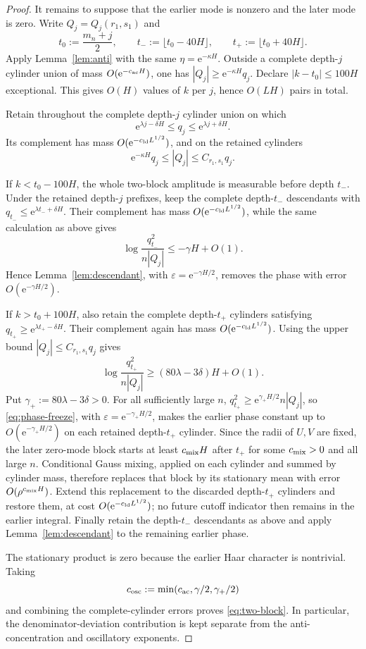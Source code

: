 \documentclass[11pt,a4paper]{amsart}
\theoremstyle{definition}
\theoremstyle{remark}
\newcommand{\e}{\mathrm e}
\begin{document}
\begin{proof}
It remains to suppose that the earlier mode is nonzero and the later mode is
zero.  Write $Q_j=Q_j(r_1,s_1)$ and
\[
 t_0:=\frac{m_n+j}{2},\qquad
 t_-:=\lfloor t_0-40H\rfloor,
 \qquad t_+:=\lfloor t_0+40H\rfloor.
\]
Apply Lemma~\ref{lem:anti} with the same
$\eta=\e^{-\kappa H}$.  Outside a complete depth-$j$ cylinder union of mass
$O(\e^{-c_{\rm ac}H})$, one has
$|Q_j|\ge\e^{-\kappa H}q_j$.  Declare
$|k-t_0|\le100H$ exceptional.  This gives $O(H)$ values of $k$ per $j$,
hence $O(LH)$ pairs in total.

Retain throughout the complete depth-$j$ cylinder union on which
\[
 \e^{\lambda j-\delta H}\le q_j\le\e^{\lambda j+\delta H}.
\]
Its complement has mass $O(\e^{-c_{\rm ld}L^{1/2}})$, and on the retained
cylinders
\[
 \e^{-\kappa H}q_j\le |Q_j|\le C_{r_1,s_1}q_j.
\]

If $k<t_0-100H$, the whole two-block amplitude is measurable before depth
$t_-$.  Under the retained depth-$j$ prefixes, keep the complete
depth-$t_-$ descendants with $q_{t_-}\le\e^{\lambda t_-+\delta H}$.  Their
complement has mass $O(\e^{-c_{\rm ld}L^{1/2}})$, while the same calculation
as above gives
\[
 \log\frac{q_{t_-}^2}{n|Q_j|}\le-\gamma H+O(1).
\]
Hence Lemma~\ref{lem:descendant}, with
$\varepsilon=\e^{-\gamma H/2}$, removes the phase with error
$O(\e^{-\gamma H/2})$.

If $k>t_0+100H$, also retain the complete depth-$t_+$ cylinders satisfying
$q_{t_+}\ge\e^{\lambda t_+-\delta H}$.  Their complement again has mass
$O(\e^{-c_{\rm ld}L^{1/2}})$.  Using the upper bound
$|Q_j|\le C_{r_1,s_1}q_j$ gives
\[
 \log\frac{q_{t_+}^2}{n|Q_j|}
 \ge(80\lambda-3\delta)H+O(1).
\]
Put $\gamma_+:=80\lambda-3\delta>0$.  For all sufficiently large $n$,
$q_{t_+}^2\ge\e^{\gamma_+H/2}n|Q_j|$, so
\eqref{eq:phase-freeze}, with $\varepsilon=\e^{-\gamma_+H/2}$, makes the
earlier phase constant up to $O(\e^{-\gamma_+H/2})$ on each retained
depth-$t_+$ cylinder.  Since the radii of $U,V$ are fixed, the later
zero-mode block starts at least $c_{\rm mix}H$ after $t_+$ for some
$c_{\rm mix}>0$ and all large $n$.  Conditional Gauss mixing, applied on
each cylinder and summed by cylinder mass, therefore replaces that block by
its stationary mean with error $O(\rho^{c_{\rm mix}H})$.  Extend this
replacement to the discarded depth-$t_+$ cylinders and restore them, at cost
$O(\e^{-c_{\rm ld}L^{1/2}})$; no future cutoff indicator then remains in the
earlier integral.  Finally retain the depth-$t_-$ descendants as above and
apply Lemma~\ref{lem:descendant} to the remaining earlier phase.

The stationary product is zero because the earlier Haar character is
nontrivial.  Taking
\[
 c_{\rm osc}:=\min(c_{\rm ac},\gamma/2,\gamma_+/2)
\]
and combining the complete-cylinder errors proves \eqref{eq:two-block}.
In particular, the denominator-deviation contribution is kept separate from
the anti-concentration and oscillatory exponents.
\end{proof}
\end{document}
